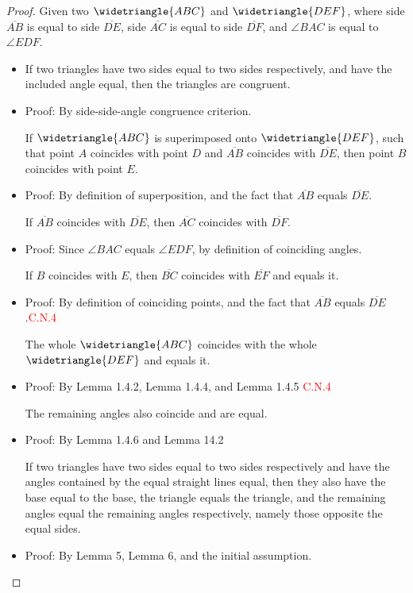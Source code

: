 \begin{proof}

Given two $\widetriangle{ABC}$ and $\widetriangle{DEF}$, where side $\overline{AB}$ is equal to side $\overline{DE}$, side $\overline{AC}$ is equal to side $\overline{DF}$, and $\angle{BAC}$ is equal to $\angle{EDF}$.

\begin{itemize}
\item
	\begin{lemma}
	If two triangles have two sides equal to two sides respectively, and have the included angle equal, then the triangles are congruent.
	\end{lemma}
\item Proof: By side-side-angle congruence criterion.
	\begin{lemma}
	If $\widetriangle{ABC}$ is superimposed onto $\widetriangle{DEF}$, such that point $A$ coincides with point $D$ and $\overline{AB}$ coincides with $\overline{DE}$, then point $B$ coincides with point $E$.
	\end{lemma}
\item Proof: By definition of superposition, and the fact that $\overline{AB}$ equals $\overline{DE}$.
	\begin{lemma}
	If $\overline{AB}$ coincides with $\overline{DE}$, then $\overline{AC}$ coincides with $\overline{DF}$.
	\end{lemma}
\item Proof: Since $\angle{BAC}$ equals $\angle{EDF}$, by definition of coinciding angles.
\clearpage
	\begin{lemma}
	 If $B$ coincides with $E$, then $\overline{BC}$ coincides with $\overline{EF}$ and equals it.
	\end{lemma}
\item Proof: By definition of coinciding points, and the fact that $\overline{AB}$ equals $\overline{DE}$.\hfill\textcolor{red}{C.N.4}
	\begin{lemma}
	The whole $\widetriangle{ABC}$ coincides with the whole $\widetriangle{DEF}$ and equals it.
	\end{lemma}
\item Proof: By Lemma 1.4.2, Lemma 1.4.4, and Lemma 1.4.5 \hfill\textcolor{red}{C.N.4}
	\begin{lemma}
	The remaining angles also coincide and are equal.
	\end{lemma}
\item Proof: By Lemma 1.4.6 and Lemma 14.2
	\begin{lemma}
	If two triangles have two sides equal to two sides respectively and have the angles contained by the equal straight lines equal, then they also have the base equal to the base, the triangle equals the triangle, and the remaining angles equal the remaining angles respectively, namely those opposite the equal sides.
	\end{lemma}
\item Proof: By Lemma 5, Lemma 6, and the initial assumption.
\end{itemize}


\end{proof}
